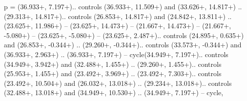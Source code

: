 {p} = {(36.933+\ctpXshift, 7.197+\ctpYshift).. controls (36.933+\ctpXshift, 11.509+\ctpYshift) and (33.626+\ctpXshift, 14.817+\ctpYshift) .. (29.313+\ctpXshift, 14.817+\ctpYshift).. controls (26.853+\ctpXshift, 14.817+\ctpYshift) and (24.842+\ctpXshift, 13.811+\ctpYshift) .. (23.625+\ctpXshift, 11.986+\ctpYshift) -- (23.625+\ctpXshift, 14.473+\ctpYshift) -- (21.667+\ctpXshift, 14.473+\ctpYshift) -- (21.667+\ctpXshift, -5.080+\ctpYshift) -- (23.625+\ctpXshift, -5.080+\ctpYshift) -- (23.625+\ctpXshift, 2.487+\ctpYshift).. controls (24.895+\ctpXshift, 0.635+\ctpYshift) and (26.853+\ctpXshift, -0.344+\ctpYshift) .. (29.260+\ctpXshift, -0.344+\ctpYshift).. controls (33.573+\ctpXshift, -0.344+\ctpYshift) and (36.933+\ctpXshift, 2.963+\ctpYshift) .. (36.933+\ctpXshift, 7.197+\ctpYshift) -- cycle(34.949+\ctpXshift, 7.197+\ctpYshift).. controls (34.949+\ctpXshift, 3.942+\ctpYshift) and (32.488+\ctpXshift, 1.455+\ctpYshift) .. (29.260+\ctpXshift, 1.455+\ctpYshift).. controls (25.953+\ctpXshift, 1.455+\ctpYshift) and (23.492+\ctpXshift, 3.969+\ctpYshift) .. (23.492+\ctpXshift, 7.303+\ctpYshift).. controls (23.492+\ctpXshift, 10.504+\ctpYshift) and (26.032+\ctpXshift, 13.018+\ctpYshift) .. (29.234+\ctpXshift, 13.018+\ctpYshift).. controls (32.488+\ctpXshift, 13.018+\ctpYshift) and (34.949+\ctpXshift, 10.530+\ctpYshift) .. (34.949+\ctpXshift, 7.197+\ctpYshift) -- cycle},

